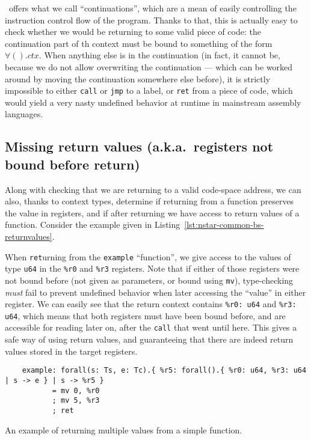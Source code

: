 \nstar\ offers what we call ``continuations'', which are a mean of easily controlling the instruction control flow of the program.
Thanks to that, this is actually easy to check whether we would be returning to some valid piece of code: the continuation part of th context must be bound to something of the form $\forall().ctx$.
When anything else is in the continuation (in fact, it cannot be, because we do not allow overwriting the continuation --- which can be worked around by moving the continuation somewhere else before), it is strictly impossible to either \texttt{call} or \texttt{jmp} to a label, or \texttt{ret} from a piece of code, which would yield a very nasty undefined behavior at runtime in mainstream assembly languages.

\subsection{Missing return values (a.k.a.\ registers not bound before return)}\label{subsec:nstar-common-bs-restrictions-unboundregs}

Along with checking that we are returning to a valid code-space address, we can also, thanks to context types, determine if returning from a function preserves the value in registers, and if after returning we have access to return values of a function.
Consider the example given in Listing~\ref{lst:nstar-common-bs-returnvalues}.

When \texttt{ret}urning from the \texttt{example} ``function'', we give access to the values of type \texttt{u64} in the \texttt{\%r0} and \texttt{\%r3} registers.
Note that if either of those registers were not bound before (not given as parameters, or bound using \texttt{mv}), type-checking \textit{must} fail to prevent undefined behavior when later accessing the ``value'' in either register.
We can easily see that the return context contains \texttt{\%r0: u64} and \texttt{\%r3: u64}, which means that both registers must have been bound before, and are accessible for reading later on, after the \texttt{call} that went until here.
This gives a safe way of using return values, and guaranteeing that there are indeed return values stored in the target registers.

\begin{listing}[htb]
  \centering
  \begin{minipage}{0.90\textwidth}
    \begin{verbatim}
    example: forall(s: Ts, e: Tc).{ %r5: forall().{ %r0: u64, %r3: u64 | s -> e } | s -> %r5 }
           = mv 0, %r0
           ; mv 5, %r3
           ; ret
    \end{verbatim}
  \end{minipage}
  \caption{An example of returning multiple values from a simple function.}
  \label{lst:nstar-common-bs-returnvalues}
\end{listing}

